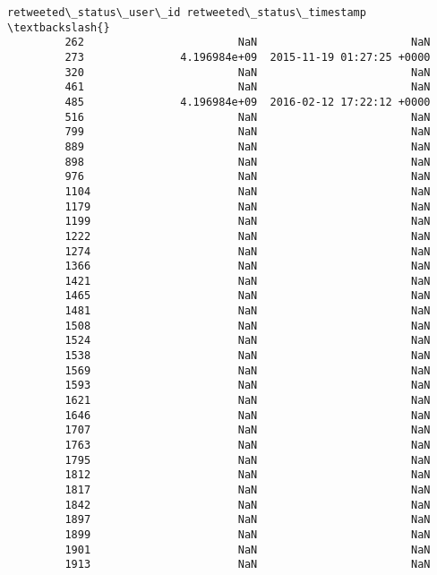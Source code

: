 \documentclass[11pt]{article}
\begin{document}
\begin{Verbatim}[commandchars=\\\{\}]
               retweeted\_status\_user\_id retweeted\_status\_timestamp  \textbackslash{}
         262                        NaN                        NaN   
         273               4.196984e+09  2015-11-19 01:27:25 +0000   
         320                        NaN                        NaN   
         461                        NaN                        NaN   
         485               4.196984e+09  2016-02-12 17:22:12 +0000   
         516                        NaN                        NaN   
         799                        NaN                        NaN   
         889                        NaN                        NaN   
         898                        NaN                        NaN   
         976                        NaN                        NaN   
         1104                       NaN                        NaN   
         1179                       NaN                        NaN   
         1199                       NaN                        NaN   
         1222                       NaN                        NaN   
         1274                       NaN                        NaN   
         1366                       NaN                        NaN   
         1421                       NaN                        NaN   
         1465                       NaN                        NaN   
         1481                       NaN                        NaN   
         1508                       NaN                        NaN   
         1524                       NaN                        NaN   
         1538                       NaN                        NaN   
         1569                       NaN                        NaN   
         1593                       NaN                        NaN   
         1621                       NaN                        NaN   
         1646                       NaN                        NaN   
         1707                       NaN                        NaN   
         1763                       NaN                        NaN   
         1795                       NaN                        NaN   
         1812                       NaN                        NaN   
         1817                       NaN                        NaN   
         1842                       NaN                        NaN   
         1897                       NaN                        NaN   
         1899                       NaN                        NaN   
         1901                       NaN                        NaN   
         1913                       NaN                        NaN   

\end{Verbatim}
\end{document}
